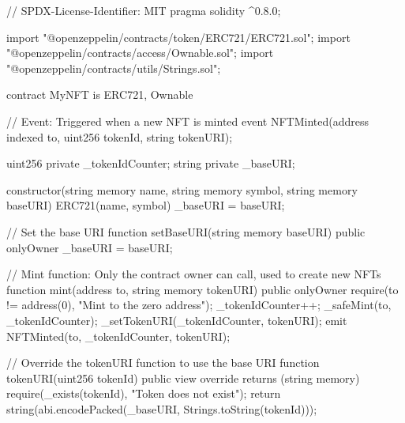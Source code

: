 // SPDX-License-Identifier: MIT
pragma solidity ^0.8.0;

import "@openzeppelin/contracts/token/ERC721/ERC721.sol";
import "@openzeppelin/contracts/access/Ownable.sol";
import "@openzeppelin/contracts/utils/Strings.sol";

contract MyNFT is ERC721, Ownable {
    
    // Event: Triggered when a new NFT is minted
    event NFTMinted(address indexed to, uint256 tokenId, string tokenURI);

    uint256 private _tokenIdCounter;
    string private _baseURI;

    constructor(string memory name, string memory symbol, string memory baseURI) ERC721(name, symbol) {
        _baseURI = baseURI;
    }

    // Set the base URI
    function setBaseURI(string memory baseURI) public onlyOwner {
        _baseURI = baseURI;
    }

    // Mint function: Only the contract owner can call, used to create new NFTs
    function mint(address to, string memory tokenURI) public onlyOwner {
        require(to != address(0), "Mint to the zero address");
        _tokenIdCounter++;
        _safeMint(to, _tokenIdCounter);
        _setTokenURI(_tokenIdCounter, tokenURI);
        emit NFTMinted(to, _tokenIdCounter, tokenURI);
    }

    // Override the tokenURI function to use the base URI
    function tokenURI(uint256 tokenId) public view override returns (string memory) {
        require(_exists(tokenId), "Token does not exist");
        return string(abi.encodePacked(_baseURI, Strings.toString(tokenId)));
    }
}